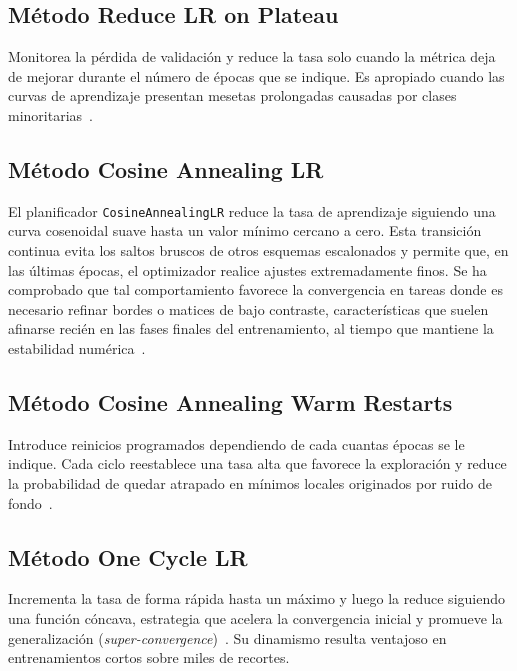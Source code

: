\subsection*{Método Reduce LR on Plateau}
Monitorea la pérdida de validación y reduce la tasa solo cuando la métrica deja de mejorar durante el número de épocas que se indique.
Es apropiado cuando las curvas de aprendizaje presentan mesetas prolongadas causadas por clases minoritarias~\cite{hinton2012}.

\subsection*{Método Cosine Annealing LR}
El planificador \texttt{CosineAnnealingLR} reduce la tasa de aprendizaje siguiendo una curva cosenoidal suave hasta un valor mínimo cercano a cero.
Esta transición continua evita los saltos bruscos de otros esquemas escalonados y permite que, en las últimas épocas, el optimizador realice ajustes extremadamente finos.
Se ha comprobado que tal comportamiento favorece la convergencia en tareas donde es necesario refinar bordes o matices de bajo contraste, características que suelen afinarse recién en las fases finales del entrenamiento, al tiempo que mantiene la estabilidad numérica~\cite{loshchilov2017}.

\subsection*{Método Cosine Annealing Warm Restarts}
Introduce reinicios programados dependiendo de cada cuantas épocas se le indique.
Cada ciclo reestablece una tasa alta que favorece la exploración y reduce la probabilidad de quedar atrapado en mínimos locales originados por ruido de fondo~\cite{loshchilov2017}.

\subsection*{Método One Cycle LR}
Incrementa la tasa de forma rápida hasta un máximo y luego la reduce siguiendo una función cóncava, estrategia que acelera la convergencia inicial y promueve la generalización (\emph{super-convergence})~\cite{smith2019}.
Su dinamismo resulta ventajoso en entrenamientos cortos sobre miles de recortes.

